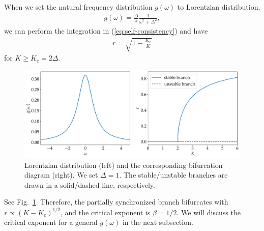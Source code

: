 When we set the natural frequency distribution $g(\omega)$ to Lorentzian distribution,
\begin{align}
  g(\omega)=\frac{\Delta}{\pi}\frac{1}{\omega^{2}+\Delta^{2}},
\end{align}
we can perform the integration in (\ref{eq:self-consistency}) and have
\begin{align}
  r=\sqrt{1-\frac{K_{\mathrm{c}}}{K}}
  \label{eq:r-lorentz}
\end{align}
for $K\geq K_{\mathrm{c}}=2\Delta$.
\begin{figure}[thbp]
  \begin{center}
    \includegraphics[width=\textwidth]{figs/lorentz-bif.pdf}
  \end{center}
  \caption{
    Lorentzian distribution (left) and the corresponding bifurcation diagram (right). We set $\Delta=1$.
    The stable/unstable branches are drawn in a solid/dashed line, respectively.
  }
  \label{fig:lorentz-bif}
\end{figure}
See Fig.~\ref{fig:lorentz-bif}.
Therefore, the partially synchronized branch bifurcates with $r\propto (K-K_{\mathrm{c}})^{1/2}$, and the critical exponent is $\beta=1/2$.
We will discuss the critical exponent for a general $g(\omega)$ in the next subsection.


